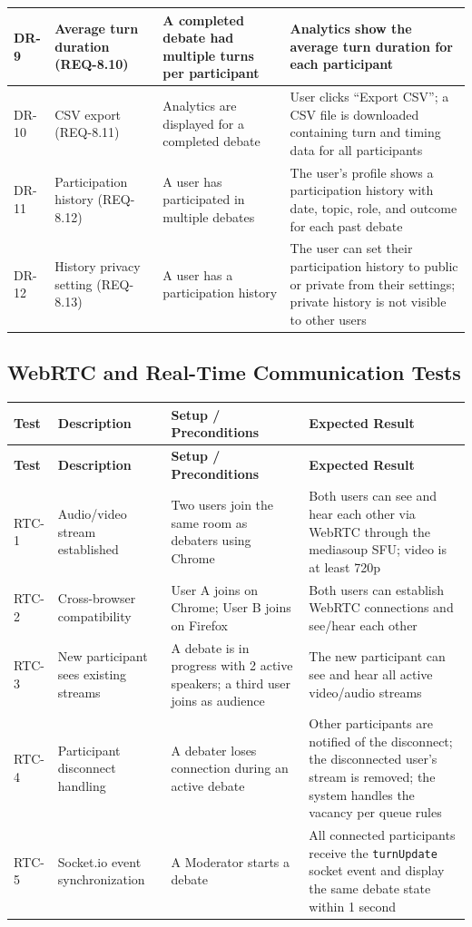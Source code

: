 \documentclass[12pt]{article}
\begin{document}
\begin{longtable}{|p{1.5cm}|p{3cm}|p{4cm}|p{4cm}|}
\hline
DR-9 & Average turn duration (REQ-8.10) & A completed debate had multiple turns per participant & Analytics show the average turn duration for each participant \\
\hline
DR-10 & CSV export (REQ-8.11) & Analytics are displayed for a completed debate & User clicks ``Export CSV''; a CSV file is downloaded containing turn and timing data for all participants \\
\hline
DR-11 & Participation history (REQ-8.12) & A user has participated in multiple debates & The user's profile shows a participation history with date, topic, role, and outcome for each past debate \\
\hline
DR-12 & History privacy setting (REQ-8.13) & A user has a participation history & The user can set their participation history to public or private from their settings; private history is not visible to other users \\
\hline
\end{longtable}

\subsection{WebRTC and Real-Time Communication Tests}

\begin{longtable}{|p{1.5cm}|p{3cm}|p{4cm}|p{4cm}|}
\hline
\textbf{Test} & \textbf{Description} & \textbf{Setup / Preconditions} & \textbf{Expected Result} \\
\hline
\endfirsthead
\hline
\textbf{Test} & \textbf{Description} & \textbf{Setup / Preconditions} & \textbf{Expected Result} \\
\hline
\endhead
RTC-1 & Audio/video stream established & Two users join the same room as debaters using Chrome & Both users can see and hear each other via WebRTC through the mediasoup SFU; video is at least 720p \\
\hline
RTC-2 & Cross-browser compatibility & User A joins on Chrome; User B joins on Firefox & Both users can establish WebRTC connections and see/hear each other \\
\hline
RTC-3 & New participant sees existing streams & A debate is in progress with 2 active speakers; a third user joins as audience & The new participant can see and hear all active video/audio streams \\
\hline
RTC-4 & Participant disconnect handling & A debater loses connection during an active debate & Other participants are notified of the disconnect; the disconnected user's stream is removed; the system handles the vacancy per queue rules \\
\hline
RTC-5 & Socket.io event synchronization & A Moderator starts a debate & All connected participants receive the \texttt{turnUpdate} socket event and display the same debate state within 1 second \\
\hline
\end{longtable}
\end{document}

